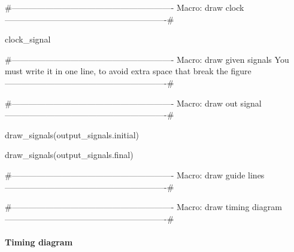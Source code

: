 {#----------------------------------------------------------
 Macro: draw clock
----------------------------------------------------------#}
{%
{%
{%
{{clock_signal}}
{%
{#----------------------------------------------------------
 Macro: draw given signals
  You must write it in one line, to avoid extra space that break the figure
----------------------------------------------------------#}
{%
{%
{%

{#----------------------------------------------------------
 Macro: draw out signal
----------------------------------------------------------#}
{%
{%
{{draw_signals(output_signals.initial)}}
{%
{{draw_signals(output_signals.final)}}
{%
{%
{#----------------------------------------------------------
 Macro: draw guide lines
----------------------------------------------------------#}
{%
{%
\begin{scope}
\end{scope}
{%
{%
\begin{scope}
\end{scope}
{%
{%
{#----------------------------------------------------------
 Macro: draw  timing diagram
----------------------------------------------------------#}
{%
\paragraph{ Timing diagram  }

}}}}}}}}}}}}}}}}}}}
